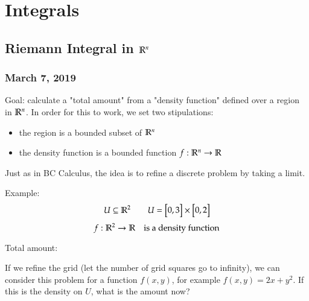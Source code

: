 \section{Integrals}
\subsection{Riemann Integral in $\mathbb{R}^n$}
\subsubsection*{March 7, 2019}
Goal: calculate a "total amount" from a "density function" defined over a region in $\mathbb{R}^n$. In order for this to work, we set two stipulations: 
\begin{itemize}
	\item the region is a bounded subset of $\mathbb{R}^n$
	\item the density function is a bounded function $f : \mathbb{R}^n \to \mathbb{R}$
\end{itemize}
Just as in BC Calculus, the idea is to refine a discrete problem by taking a limit. 

Example: 
\[U \subseteq \mathbb{R}^2\qquad U = \begin{bmatrix} 0,3 \end{bmatrix}\times \begin{bmatrix} 0,2 \end{bmatrix}\]
\[f : \mathbb{R}^2 \to \mathbb{R} \quad \text{is a density function}\]
\begin{center}

Total amount: 
\end{center}

If we refine the grid (let the number of grid squares go to infinity), we can consider this problem for a function $f(x,y)$, for example $f(x,y)=2x+y^2$. If this is the density on $U$, what is the amount now? 

